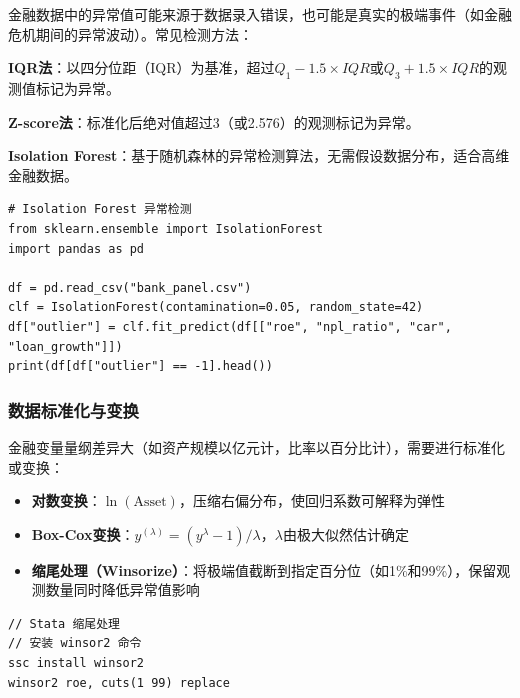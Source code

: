 金融数据中的异常值可能来源于数据录入错误，也可能是真实的极端事件（如金融危机期间的异常波动）。常见检测方法：

\textbf{IQR法}：以四分位距（IQR）为基准，超过$Q_1 - 1.5 \times IQR$或$Q_3 + 1.5 \times IQR$的观测值标记为异常。

\textbf{Z-score法}：标准化后绝对值超过3（或2.576）的观测标记为异常。

\textbf{Isolation Forest}：基于随机森林的异常检测算法，无需假设数据分布，适合高维金融数据。

\begin{lstlisting}[style=python]
# Isolation Forest 异常检测
from sklearn.ensemble import IsolationForest
import pandas as pd

df = pd.read_csv("bank_panel.csv")
clf = IsolationForest(contamination=0.05, random_state=42)
df["outlier"] = clf.fit_predict(df[["roe", "npl_ratio", "car", "loan_growth"]])
print(df[df["outlier"] == -1].head())
\end{lstlisting}

\subsubsection{数据标准化与变换}

金融变量量纲差异大（如资产规模以亿元计，比率以百分比计），需要进行标准化或变换：

\begin{itemize}[leftmargin=2em]
  \item \textbf{对数变换}：$\ln(\text{Asset})$，压缩右偏分布，使回归系数可解释为弹性
  \item \textbf{Box-Cox变换}：$y^{(\lambda)} = (y^\lambda - 1)/\lambda$，$\lambda$由极大似然估计确定
  \item \textbf{缩尾处理（Winsorize）}：将极端值截断到指定百分位（如1\%和99\%），保留观测数量同时降低异常值影响
\end{itemize}

\begin{lstlisting}[style=stata]
// Stata 缩尾处理
// 安装 winsor2 命令
ssc install winsor2
winsor2 roe, cuts(1 99) replace
\end{lstlisting}

